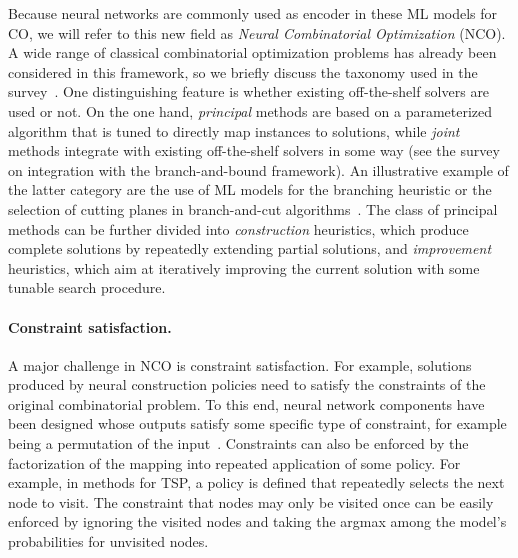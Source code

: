 \documentclass[a4paper]{report}
\theoremstyle{definition}
\theoremstyle{plain}
\begin{document}
Because neural networks are commonly used as encoder in these ML models for CO,
we will refer to this new field as \textit{Neural Combinatorial Optimization} (NCO).
%
A wide range of classical combinatorial optimization problems has already been
considered in this framework, so we briefly discuss the taxonomy used in the
survey~\cite{mazyavkinaReinforcementLearningCombinatorial2020}.
One distinguishing feature is whether existing off-the-shelf solvers are used or
not. On the one hand, \textit{principal} methods are based on a parameterized algorithm
that is tuned to directly map instances to solutions, while \textit{joint} methods
integrate with existing off-the-shelf solvers in some way (see the
survey~\cite{lodiLearningBranchingSurvey2017} on integration with the
branch-and-bound framework). An illustrative example of the latter category are
the use of ML models for the branching heuristic or the selection of cutting
planes in branch-and-cut algorithms~\cite{tangReinforcementLearningInteger2020}.
The class of principal methods can be further divided into \textit{construction}
heuristics, which produce complete solutions by repeatedly extending partial
solutions, and \textit{improvement} heuristics, which aim at iteratively improving the
current solution with some tunable search procedure.




\paragraph{Constraint satisfaction.}
A major challenge in NCO is constraint
satisfaction. For example, solutions produced by neural construction policies
need to satisfy the constraints of the original combinatorial problem.
To this
end, neural network components have been designed whose outputs satisfy some
specific type of constraint, for example being a permutation of the
input~\cite{vinyalsPointerNetworks2017a}. Constraints can also be enforced by
the factorization of the mapping into repeated application of some policy. For
example, in methods for TSP, a policy is defined that repeatedly selects the
next node to visit. The constraint that nodes may only be visited once can be
easily enforced by ignoring the visited nodes and taking the argmax among the
model's probabilities for unvisited nodes.
\end{document}

